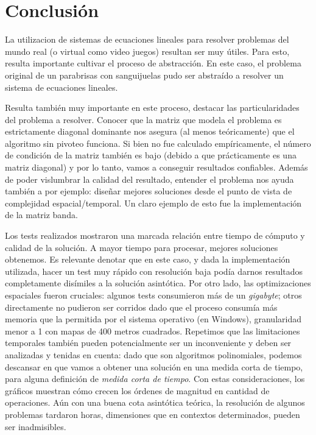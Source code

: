 	
	
\section{Conclusión}


	La utilizacion de sistemas de ecuaciones lineales para resolver problemas del mundo real (o virtual como video juegos) resultan ser muy útiles. Para esto, resulta importante cultivar el proceso de abstracción. En este caso, el problema original de un parabrisas con sanguijuelas pudo ser abstraído a resolver un sistema de ecuaciones lineales. 

	\par
	Resulta también muy importante en este proceso, destacar las particularidades del problema a resolver. Conocer que la matriz que modela el problema es estrictamente diagonal dominante nos asegura (al menos teóricamente) que el algoritmo sin pivoteo funciona. Si bien no fue calculado empíricamente, el número de condición de la matriz también es bajo (debido a que prácticamente es una matriz diagonal) y por lo tanto, vamos a conseguir resultados confiables. Además de poder vislumbrar la calidad del resultado, entender el problema nos ayuda también a por ejemplo: diseñar mejores soluciones desde el punto de vista de complejidad espacial/temporal. Un claro ejemplo de esto fue la implementación de la matriz banda.

	\par
	Los tests realizados mostraron una marcada relación entre tiempo de cómputo y calidad de la solución. A mayor tiempo para procesar, mejores soluciones obtenemos. Es relevante denotar que en este caso, y dada la implementación utilizada, hacer un test muy rápido con resolución baja podía darnos resultados completamente disímiles a la solución asintótica. Por otro lado, las optimizaciones espaciales fueron cruciales: algunos tests consumieron más de un \textit{gigabyte}; otros directamente no pudieron ser corridos dado que el proceso consumía más memoria que la permitida por el sistema operativo (en Windows), granularidad menor a 1 con mapas de 400 metros cuadrados. Repetimos que las limitaciones temporales también pueden potencialmente ser un inconveniente y deben ser analizadas y tenidas en cuenta: dado que son algoritmos polinomiales, podemos descansar en que vamos a obtener una solución en una medida corta de tiempo, para alguna definición de \textit{medida corta de tiempo}. Con estas consideraciones, los gráficos muestran cómo crecen los órdenes de magnitud en cantidad de operaciones. Aún con una buena cota asintótica teórica, la resolución de algunos problemas tardaron horas, dimensiones que en contextos determinados, pueden ser inadmisibles.

